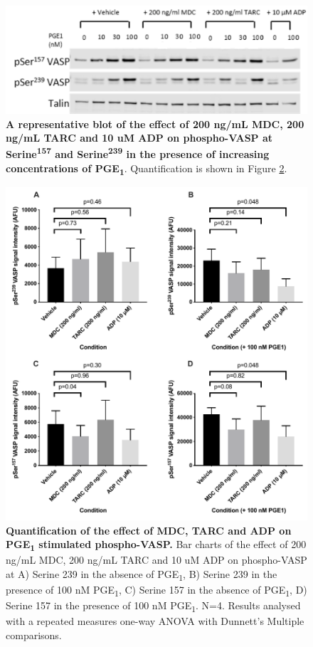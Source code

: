 \documentclass[11pt,twoside]{bristolthesis}
\begin{document}
\begin{figure}
\includegraphics[width=0.55\linewidth]{figure/Chemokines/MDC_TARC_VASP_blot} \caption[A representative blot of the effect of MDC, TARC and ADP on PGE\textsubscript{1} stimulated phospho-VASP.]{\textbf{A representative blot of the effect of 200 ng/mL MDC, 200 ng/mL TARC and 10 uM ADP on phospho-VASP at Serine\textsuperscript{157} and Serine\textsuperscript{239} in the presence of increasing concentrations of PGE\textsubscript{1}}. Quantification is shown in Figure \ref{fig:MDC-TARC-wp-VASP-bar}.}\label{fig:MDC-TARC-wp-WB-VASP}
\end{figure}


\begin{figure}
\includegraphics{figure/Chemokines/Layouts/MDC_TARC_WB_VASP} \caption[Quantification of the effect of MDC, TARC and ADP on PGE\textsubscript{1} stimulated phospho-VASP.]{\textbf{Quantification of the effect of MDC, TARC and ADP on PGE\textsubscript{1} stimulated phospho-VASP.} Bar charts of the effect of 200 ng/mL MDC, 200 ng/mL TARC and 10 uM ADP on phospho-VASP at A) Serine 239 in the absence of PGE\textsubscript{1}, B) Serine 239 in the presence of 100 nM PGE\textsubscript{1}, C) Serine 157 in the absence of PGE\textsubscript{1}, D) Serine 157 in the presence of 100 nM PGE\textsubscript{1}. N=4. Results analysed with a repeated measures one-way ANOVA with Dunnett's Multiple comparisons.}\label{fig:MDC-TARC-wp-VASP-bar}
\end{figure}
\end{document}
